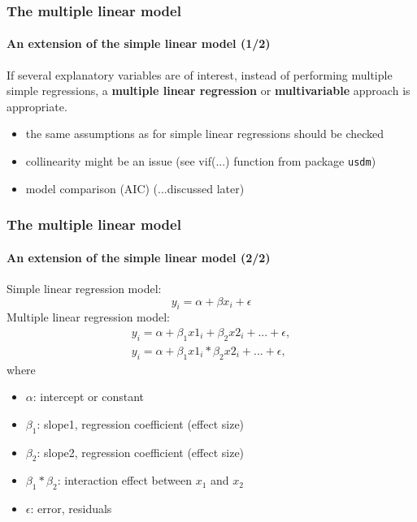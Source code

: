 \documentclass{beamer}\usepackage[]{graphicx}\usepackage[]{color}
\begin{document}
{{{%

\usebackgroundtemplate{}
\begin{frame}
\frametitle{The multiple linear model}
\framesubtitle{An extension of the simple linear model (1/2)}
If several explanatory variables are of interest, instead of performing multiple
simple regressions, a {\bfseries multiple linear regression} or
{\bfseries multivariable} approach is appropriate.
\begin{itemize}
\item the same assumptions as for simple linear regressions should be checked
\item collinearity might be an issue (see vif(...) function from package \texttt{usdm})
\item model comparison (AIC) (...discussed later)
\end{itemize}
\end{frame}


\usebackgroundtemplate{}
\begin{frame}
\frametitle{The multiple linear model}
\framesubtitle{An extension of the simple linear model (2/2)}
Simple linear regression model:
\begin{equation}
y_i = \alpha + \beta x_i + \epsilon \nonumber
\end{equation}
Multiple linear regression model:
\begin{eqnarray}
y_i = \alpha + \beta_1 x1_i + \beta_2 x2_i + ... + \epsilon, \\
y_i = \alpha + \beta_1 x1_i * \beta_2 x2_i + ... + \epsilon, \nonumber
\end{eqnarray}
where
\begin{itemize}
\item $\alpha$: intercept or constant
\item $\beta_1$: slope1, regression coefficient (effect size)
\item $\beta_2$: slope2, regression coefficient (effect size)
\item $\beta_1 * \beta_2$: interaction effect between $x_1$ and $x_2$
\item $\epsilon$: error, residuals
\end{itemize}
\end{frame}

}}}
\end{document}
